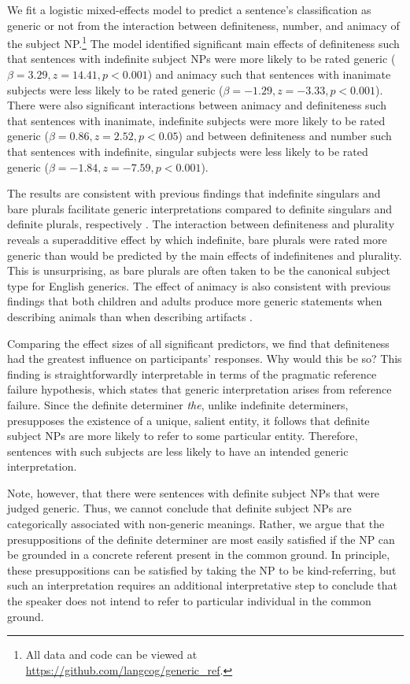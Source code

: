 \documentclass[10pt,letterpaper]{article}
\begin{document}
We fit a logistic mixed-effects model to predict a sentence's classification as generic or not from the interaction between definiteness, number, and animacy of the subject NP.\footnote{All data and code can be viewed at \url{https://github.com/langcog/generic_ref}.} The model identified significant main effects of definiteness such that sentences with indefinite subject NPs were more likely to be rated generic (\(\beta = 3.29, z = 14.41, p < 0.001\)) and animacy such that sentences with inanimate subjects were less likely to be rated generic (\(\beta = -1.29, z = -3.33, p < 0.001\)). There were also significant interactions between animacy and definiteness such that sentences with inanimate, indefinite subjects were more likely to be rated generic (\(\beta = 0.86, z = 2.52, p < 0.05\)) and between definiteness and number such that sentences with indefinite, singular subjects were less likely to be rated generic (\(\beta = -1.84, z = -7.59, p < 0.001\)).

The results are consistent with previous findings that indefinite singulars and bare plurals facilitate generic interpretations compared to definite singulars and definite plurals, respectively \cite{Cimpian:2011, Gelman:2003}. The interaction between definiteness and plurality reveals a superadditive effect by which indefinite, bare plurals were rated more generic than would be predicted by the main effects of indefinitenes and plurality. This is unsurprising, as bare plurals are often taken to be the canonical subject type for English generics. The effect of animacy is also consistent with previous findings that both children and adults produce more generic statements when describing animals than when describing artifacts \cite{Brandone:2009}.

Comparing the effect sizes of all significant predictors, we find that definiteness had the greatest influence on participants' responses. Why would this be so? This finding is straightforwardly interpretable in terms of the pragmatic reference failure hypothesis, which states that generic interpretation arises from reference failure. Since the definite determiner \textit{the}, unlike indefinite determiners, presupposes the existence of a unique, salient entity, it follows that definite subject NPs are more likely to refer to some particular entity. Therefore, sentences with such subjects are less likely to have an intended generic interpretation.

Note, however, that there were sentences with definite subject NPs that were judged generic. Thus, we cannot conclude that definite subject NPs are categorically associated with non-generic meanings. Rather, we argue that the presuppositions of the definite determiner are most easily satisfied if the NP can be grounded in a concrete referent present in the common ground. In principle, these presuppositions can be satisfied by taking the NP to be kind-referring, but such an interpretation requires an additional interpretative step to conclude that the speaker does not intend to refer to particular individual in the common ground.
\end{document}
